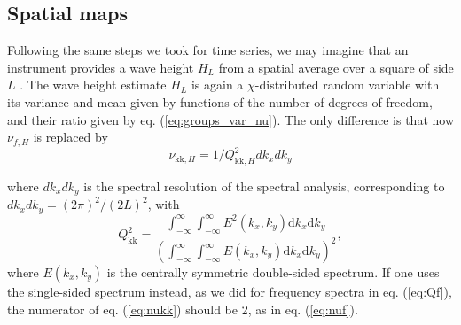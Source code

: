 {\subsection{Spatial maps}
Following the same steps we took for time series, we may imagine that an instrument provides a wave height  $H_{L}$ from a spatial average over a 
square of side $L$ \citep{Lenain&al.2023,Ardhuin&al.2024}. The wave height estimate $H_L$ is  again a $\chi$-distributed random variable with its variance and mean given by  functions of the number of 
degrees of freedom, and their ratio given by eq. (\ref{eq:groups_var_nu}). The only difference is that now  $\nu_{f,H}$ is replaced by 
\begin{equation} 
\nu_{\mathrm{kk},H}=1/ Q_{\mathrm{kk},H}^2 dk_x dk_y \label{eq:nukk}
\end{equation}

 where $dk_x dk_y$ is the spectral resolution of the spectral analysis, corresponding to $dk_x dk_y=(2 \pi)^2/(2 L)^2$, with 
\begin{equation} 
   Q_{\mathrm{kk}}^2 = \frac{  \int_{-\infty}^\infty \int_{-\infty}^\infty E^2(k_x,k_y)\mathrm{d}k_x \mathrm{d}k_y }{\left( \int_{-\infty}^\infty \int_{-\infty}^\infty E(k_x,k_y)\mathrm{d}k_x \mathrm{d}k_y  \right)^2} \label{eq:Qkk},
\end{equation}
where  $E(k_x,k_y)$ is the centrally symmetric double-sided spectrum. If one uses the single-sided spectrum instead, as we did for frequency spectra in eq. (\ref{eq:Qf}), the numerator of eq. (\ref{eq:nukk}) should be 2, as in  eq. (\ref{eq:nuf}). 

}
